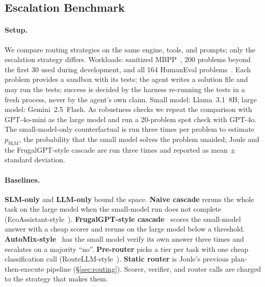 \subsection{Escalation Benchmark}
\label{sec:eval-escalation}

\paragraph{Setup.}
We compare routing strategies on the same engine, tools, and prompts; only the escalation strategy differs.
Workloads: sanitized MBPP~\cite{austin2021mbpp}, 200 problems beyond the first 30 used during development, and all 164 HumanEval problems~\cite{chen2021humaneval}.
Each problem provides a sandbox with its tests; the agent writes a solution file and may run the tests; success is decided by the harness re-running the tests in a fresh process, never by the agent's own claim.
Small model: Llama~3.1~8B; large model: Gemini~2.5~Flash.
As robustness checks we repeat the comparison with GPT-4o-mini as the large model and run a 20-problem spot check with GPT-4o.
The small-model-only counterfactual is run three times per problem to estimate $p_{\text{SLM}}$, the probability that the small model solves the problem unaided; Joule and the FrugalGPT-style cascade are run three times and reported as mean $\pm$ standard deviation.

\paragraph{Baselines.}
\textbf{SLM-only} and \textbf{LLM-only} bound the space.
\textbf{Naive cascade} reruns the whole task on the large model when the small-model run does not complete (EcoAssistant-style~\cite{zhang2023ecoassistant}).
\textbf{FrugalGPT-style cascade}~\cite{chen2023frugalgpt} scores the small-model answer with a cheap scorer and reruns on the large model below a threshold.
\textbf{AutoMix-style}~\cite{madaan2023automix} has the small model verify its own answer three times and escalates on a majority ``no''.
\textbf{Pre-router} picks a tier per task with one cheap classification call (RouteLLM-style~\cite{ong2024routellm}).
\textbf{Static router} is Joule's previous plan-then-execute pipeline (\S\ref{sec:routing}).
Scorer, verifier, and router calls are charged to the strategy that makes them.

